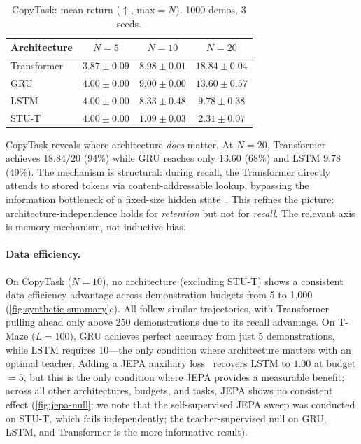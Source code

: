 \begin{table}[ht]
\centering
\caption{CopyTask: mean return ($\uparrow$, max${=}N$). 1000 demos, 3 seeds.}
\label{tab:copy-standard}
\begin{tabular}{lccc}
\toprule
Architecture & $N=5$ & $N=10$ & $N=20$ \\
\midrule
Transformer    & $3.87 \pm 0.09$ & $\mathbf{8.98 \pm 0.01}$ & $\mathbf{18.84 \pm 0.04}$ \\
GRU            & $\mathbf{4.00 \pm 0.00}$ & $\mathbf{9.00 \pm 0.00}$ & $13.60 \pm 0.57$ \\
LSTM           & $\mathbf{4.00 \pm 0.00}$ & $8.33 \pm 0.48$ & $9.78 \pm 0.38$ \\
STU-T          & $\mathbf{4.00 \pm 0.00}$ & $1.09 \pm 0.03$ & $2.31 \pm 0.07$ \\
\bottomrule
\end{tabular}
\end{table}

CopyTask reveals where architecture \emph{does} matter.
At $N{=}20$, Transformer achieves $18.84/20$ (94\%) while GRU reaches only $13.60$ (68\%) and LSTM $9.78$ (49\%).
The mechanism is structural: during recall, the Transformer directly attends to stored tokens via content-addressable lookup, bypassing the information bottleneck of a fixed-size hidden state~\citep{chen2021decision}.
This refines the picture: architecture-independence holds for \emph{retention} but not for \emph{recall}.
The relevant axis is memory mechanism, not inductive bias.

\paragraph{Data efficiency.}
On CopyTask ($N{=}10$), no architecture (excluding STU-T) shows a consistent data efficiency advantage across demonstration budgets from 5 to 1{,}000 (\cref{fig:synthetic-summary}c).
All follow similar trajectories, with Transformer pulling ahead only above 250 demonstrations due to its recall advantage.
On T-Maze ($L{=}100$), GRU achieves perfect accuracy from just 5 demonstrations, while LSTM requires 10---the only condition where architecture matters with an optimal teacher.
Adding a JEPA auxiliary loss~\citep{assran2023ijepa, lecun2022path} recovers LSTM to $1.00$ at budget${=}5$, but this is the only condition where JEPA provides a measurable benefit; across all other architectures, budgets, and tasks, JEPA shows no consistent effect (\cref{fig:jepa-null}; we note that the self-supervised JEPA sweep was conducted on STU-T, which fails independently; the teacher-supervised null on GRU, LSTM, and Transformer is the more informative result).


